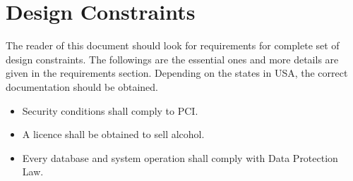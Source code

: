 \section{Design Constraints}
The reader of this document should look for requirements for complete set of design constraints. The followings are the essential ones and more details are given in the requirements section. Depending on the states in USA, the correct documentation should be obtained.

\begin{itemize}
    \item Security conditions shall comply to PCI\cite{cite:PCI_rules}.
    \item A licence shall be obtained to sell alcohol\cite{cite:alkol}.
    \item Every database and system operation shall comply with Data Protection Law\cite{cite:data_protection_law}.
\end{itemize}